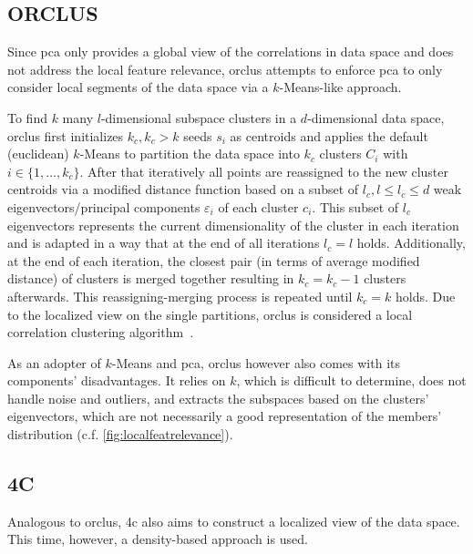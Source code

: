 \subsection{ORCLUS}
Since \gls{pca} only provides a global view of the correlations in data space and does not address the local feature relevance, \gls{orclus} attempts to enforce \gls{pca} to only consider local segments of the data space via a $k$-Means-like approach. 

To find $k$ many $l$-dimensional subspace clusters in a $d$-dimensional data space, \gls{orclus} first initializes $k_c, k_c > k$ seeds $s_i$ as centroids and applies the default (euclidean) $k$-Means to partition the data space into $k_c$ clusters $C_i$ with $i \in \{1,\dotsc,k_c\}$. 
After that iteratively all points are reassigned to the new cluster centroids via a modified distance function based on a subset of $l_c, l\leq l_c \leq d$ weak eigenvectors/principal components $\varepsilon_i$ of each cluster $c_i$. This subset of $l_c$ eigenvectors represents the current dimensionality of the cluster in each iteration and is adapted in a way that at the end of all iterations $l_c=l$ holds. Additionally, at the end of each iteration, the closest pair (in terms of average modified distance) of clusters is merged together resulting in $k_c = k_c-1$ clusters afterwards. 
This reassigning-merging process is repeated until $k_c = k$ holds. Due to the localized view on the single partitions, \gls{orclus} is considered a local correlation clustering algorithm~\cite{orclusaggarwal2000finding}.

As an adopter of $k$-Means and \gls{pca}, \gls{orclus} however also comes with its components' disadvantages. It relies on $k$, which is difficult to determine, does not handle noise and outliers, and extracts the subspaces based on the clusters' eigenvectors, which are not necessarily a good representation of the members' distribution (c.f. \autoref{fig:localfeatrelevance}).


\subsection{4C}\label{ssec:4c}
Analogous to \gls{orclus}, \gls{4c} also aims to construct a localized view of the data space. This time, however, a density-based approach is used. 

